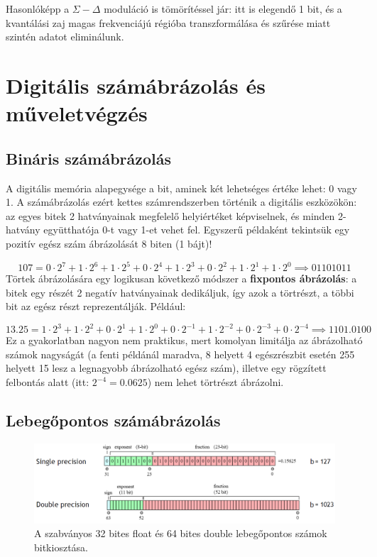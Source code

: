 \documentclass[12pt]{article}
\theoremstyle{plain}
\begin{document}
Hasonlóképp a $\Sigma-\Delta$ moduláció is tömörítéssel jár: itt is elegendő 1 bit, és a kvantálási zaj magas frekvenciájú régióba transzformálása és szűrése miatt szintén adatot eliminálunk.


\section{Digitális számábrázolás és műveletvégzés}

\subsection{Bináris számábrázolás}

A digitális memória alapegysége a bit, aminek két lehetséges értéke lehet: 0 vagy 1. A számábrázolás ezért kettes számrendszerben történik a digitális eszközökön: az egyes bitek 2 hatványainak megfelelő helyiértéket képviselnek, és minden 2-hatvány együtthatója 0-t vagy 1-et vehet fel. Egyszerű példaként tekintsük egy pozitív egész szám ábrázolását 8 biten (1 bájt)!

\begin{equation}
	107 = 0 \cdot 2^7 + 1 \cdot 2^6 + 1 \cdot 2^5 + 0 \cdot 2^4 + 1 \cdot 2^3 + 0 \cdot 2^2 + 1 \cdot 2^1 + 1 \cdot 2^0 \implies 01101011
\end{equation}
Törtek ábrázolására egy logikusan következő módszer a \textbf{fixpontos ábrázolás}: a bitek egy részét 2 negatív hatványainak dedikáljuk, így azok a törtrészt, a többi bit az egész részt reprezentálják. Például:

\begin{equation}
	13.25 = 1 \cdot 2^3 + 1 \cdot 2^2 + 0 \cdot 2^1 + 1 \cdot 2^0 +
	 0 \cdot 2^{-1} + 1 \cdot 2^{-2} + 0 \cdot 2^{-3} + 0 \cdot 2^{-4} 
	 \implies 1101.0100
\end{equation}
Ez a gyakorlatban nagyon nem praktikus, mert komolyan limitálja az ábrázolható számok nagyságát (a fenti példánál maradva, 8 helyett 4 egészrészbit esetén 255 helyett 15 lesz a legnagyobb ábrázolható egész szám), illetve egy rögzített felbontás alatt (itt: $2^{-4} = 0.0625$) nem lehet törtrészt ábrázolni. 


\subsection{Lebegőpontos számábrázolás}

\begin{figure}
	\centering
	\includegraphics[width=\linewidth]{media/IEEE754}
	\caption{A szabványos 32 bites float és 64 bites double lebegőpontos számok bitkiosztása.}
	\label{fig:ieee754}
\end{figure}
\end{document}
